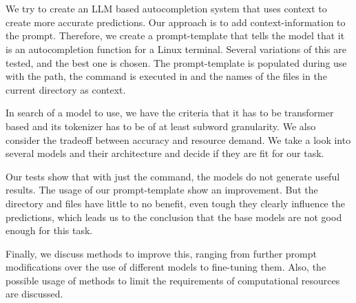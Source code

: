\section*{}



We try to create an LLM based autocompletion system that uses context to create more accurate predictions.
Our approach is to add context-information to the prompt. Therefore, we create a prompt-template that tells the model that it is an autocompletion function for a Linux terminal. Several variations of this are tested, and the best one is chosen. The prompt-template is populated during use with the path, the command is executed in and the names of the files in the current directory as context.



In search of a model to use, we have the criteria that it has to be transformer based and its tokenizer has to be of at least subword granularity. We also consider the tradeoff between accuracy and resource demand. We take a look into several models and their architecture and decide if they are fit for our task.



Our tests show that with just the command, the models do not generate useful results. The usage of our prompt-template show an improvement. But the directory and files have little to no benefit, even tough they clearly influence the predictions, which leads us to the conclusion that the base models are not good enough for this task.

Finally, we discuss methods to improve this, ranging from further prompt modifications over the use of different models to fine-tuning them. Also, the possible usage of methods to limit the requirements of computational resources are discussed.